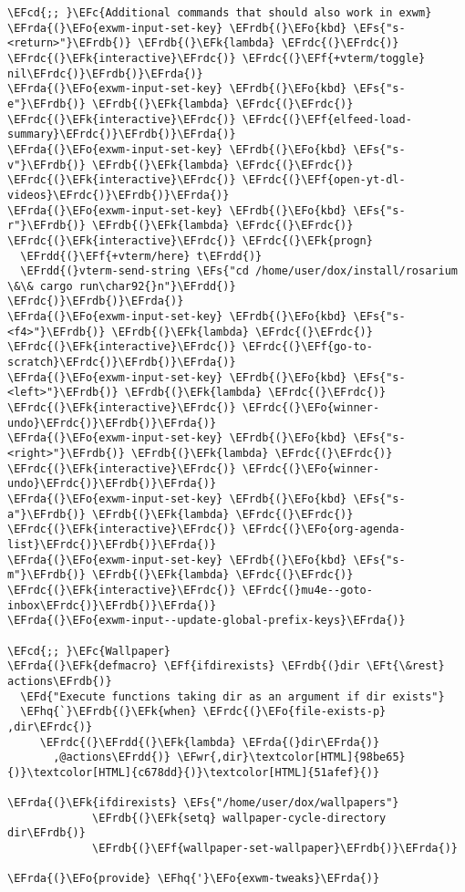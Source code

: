 \documentclass[a4wide,10pt]{article}
\newcommand{\EFc}[1]{\textcolor{EFc}{#1}} %
\newcommand{\EFcd}[1]{\textcolor{EFcd}{#1}} %
\newcommand{\EFs}[1]{\textcolor{EFs}{#1}} %
\newcommand{\EFd}[1]{\textcolor{EFd}{#1}} %
\newcommand{\EFk}[1]{\textcolor{EFk}{#1}} %
\newcommand{\EFf}[1]{\textcolor{EFf}{#1}} %
\newcommand{\EFt}[1]{\textcolor{EFt}{#1}} %
\newcommand{\EFo}[1]{\textcolor{EFo}{#1}} %
\newcommand{\EFwr}[1]{\textcolor{EFwr}{#1}} %
\newcommand{\EFhq}[1]{\textcolor{EFhq}{#1}} %
\newcommand{\EFrda}[1]{\textcolor{EFrda}{#1}} %
\newcommand{\EFrdb}[1]{\textcolor{EFrdb}{#1}} %
\newcommand{\EFrdc}[1]{\textcolor{EFrdc}{#1}} %
\newcommand{\EFrdd}[1]{\textcolor{EFrdd}{#1}} %
\begin{document}
\begin{Code}
\begin{Verbatim}
\EFcd{;; }\EFc{Additional commands that should also work in exwm}
\EFrda{(}\EFo{exwm-input-set-key} \EFrdb{(}\EFo{kbd} \EFs{"s-<return>"}\EFrdb{)} \EFrdb{(}\EFk{lambda} \EFrdc{(}\EFrdc{)} \EFrdc{(}\EFk{interactive}\EFrdc{)} \EFrdc{(}\EFf{+vterm/toggle} nil\EFrdc{)}\EFrdb{)}\EFrda{)}
\EFrda{(}\EFo{exwm-input-set-key} \EFrdb{(}\EFo{kbd} \EFs{"s-e"}\EFrdb{)} \EFrdb{(}\EFk{lambda} \EFrdc{(}\EFrdc{)} \EFrdc{(}\EFk{interactive}\EFrdc{)} \EFrdc{(}\EFf{elfeed-load-summary}\EFrdc{)}\EFrdb{)}\EFrda{)}
\EFrda{(}\EFo{exwm-input-set-key} \EFrdb{(}\EFo{kbd} \EFs{"s-v"}\EFrdb{)} \EFrdb{(}\EFk{lambda} \EFrdc{(}\EFrdc{)} \EFrdc{(}\EFk{interactive}\EFrdc{)} \EFrdc{(}\EFf{open-yt-dl-videos}\EFrdc{)}\EFrdb{)}\EFrda{)}
\EFrda{(}\EFo{exwm-input-set-key} \EFrdb{(}\EFo{kbd} \EFs{"s-r"}\EFrdb{)} \EFrdb{(}\EFk{lambda} \EFrdc{(}\EFrdc{)} \EFrdc{(}\EFk{interactive}\EFrdc{)} \EFrdc{(}\EFk{progn}
  \EFrdd{(}\EFf{+vterm/here} t\EFrdd{)}
  \EFrdd{(}vterm-send-string \EFs{"cd /home/user/dox/install/rosarium \&\& cargo run\char92{}n"}\EFrdd{)}
\EFrdc{)}\EFrdb{)}\EFrda{)}
\EFrda{(}\EFo{exwm-input-set-key} \EFrdb{(}\EFo{kbd} \EFs{"s-<f4>"}\EFrdb{)} \EFrdb{(}\EFk{lambda} \EFrdc{(}\EFrdc{)} \EFrdc{(}\EFk{interactive}\EFrdc{)} \EFrdc{(}\EFf{go-to-scratch}\EFrdc{)}\EFrdb{)}\EFrda{)}
\EFrda{(}\EFo{exwm-input-set-key} \EFrdb{(}\EFo{kbd} \EFs{"s-<left>"}\EFrdb{)} \EFrdb{(}\EFk{lambda} \EFrdc{(}\EFrdc{)} \EFrdc{(}\EFk{interactive}\EFrdc{)} \EFrdc{(}\EFo{winner-undo}\EFrdc{)}\EFrdb{)}\EFrda{)}
\EFrda{(}\EFo{exwm-input-set-key} \EFrdb{(}\EFo{kbd} \EFs{"s-<right>"}\EFrdb{)} \EFrdb{(}\EFk{lambda} \EFrdc{(}\EFrdc{)} \EFrdc{(}\EFk{interactive}\EFrdc{)} \EFrdc{(}\EFo{winner-undo}\EFrdc{)}\EFrdb{)}\EFrda{)}
\EFrda{(}\EFo{exwm-input-set-key} \EFrdb{(}\EFo{kbd} \EFs{"s-a"}\EFrdb{)} \EFrdb{(}\EFk{lambda} \EFrdc{(}\EFrdc{)} \EFrdc{(}\EFk{interactive}\EFrdc{)} \EFrdc{(}\EFo{org-agenda-list}\EFrdc{)}\EFrdb{)}\EFrda{)}
\EFrda{(}\EFo{exwm-input-set-key} \EFrdb{(}\EFo{kbd} \EFs{"s-m"}\EFrdb{)} \EFrdb{(}\EFk{lambda} \EFrdc{(}\EFrdc{)} \EFrdc{(}\EFk{interactive}\EFrdc{)} \EFrdc{(}mu4e--goto-inbox\EFrdc{)}\EFrdb{)}\EFrda{)}
\EFrda{(}\EFo{exwm-input--update-global-prefix-keys}\EFrda{)}

\EFcd{;; }\EFc{Wallpaper}
\EFrda{(}\EFk{defmacro} \EFf{ifdirexists} \EFrdb{(}dir \EFt{\&rest} actions\EFrdb{)}
  \EFd{"Execute functions taking dir as an argument if dir exists"}
  \EFhq{`}\EFrdb{(}\EFk{when} \EFrdc{(}\EFo{file-exists-p} ,dir\EFrdc{)}
     \EFrdc{(}\EFrdd{(}\EFk{lambda} \EFrda{(}dir\EFrda{)}
       ,@actions\EFrdd{)} \EFwr{,dir}\textcolor[HTML]{98be65}{)}\textcolor[HTML]{c678dd}{)}\textcolor[HTML]{51afef}{)}

\EFrda{(}\EFk{ifdirexists} \EFs{"/home/user/dox/wallpapers"}
             \EFrdb{(}\EFk{setq} wallpaper-cycle-directory dir\EFrdb{)}
             \EFrdb{(}\EFf{wallpaper-set-wallpaper}\EFrdb{)}\EFrda{)}

\EFrda{(}\EFo{provide} \EFhq{'}\EFo{exwm-tweaks}\EFrda{)}
\end{Verbatim}
\end{Code}
\end{document}
